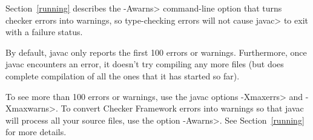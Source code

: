 %
%
%
%
%
%
%



Section~\ref{running} describes the \<-Awarns> command-line
option that turns checker errors into warnings, so type-checking errors
will not cause \<javac> to exit with a failure status.



By default, javac only reports the first 100 errors or warnings.
Furthermore, once javac encounters an error, it doesn't try compiling any
more files (but does complete compilation of all the ones that it has
started so far).

To see more than 100 errors or warnings, use the javac options \<-Xmaxerrs>
and \<-Xmaxwarns>.  To convert Checker Framework errors into warnings so
that javac will process all your source files, use the option \<-Awarns>.
See Section~\ref{running} for more details.



